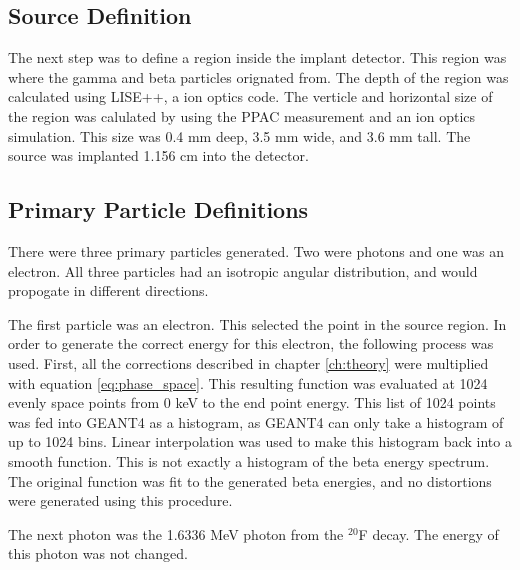 \subsection{Source Definition}
The next step was to define a region inside the implant detector.
This region was where the gamma and beta particles orignated from.
The depth of the region was calculated using LISE++, a ion optics code.
The verticle and horizontal size of the region was calulated by using the PPAC measurement and an ion optics simulation.
This size was 0.4 mm deep, 3.5 mm wide, and 3.6 mm tall.
The source was implanted 1.156 cm into the detector.

\subsection{Primary Particle Definitions}
There were three primary particles generated.
Two were photons and one was an electron.
All three particles had an isotropic angular distribution, and would propogate in different directions.

The first particle was an electron. 
This selected the point in the source region.
In order to generate the correct energy for this electron, the following process was used.
First, all the corrections described in chapter \ref{ch:theory} were multiplied with equation \ref{eq:phase_space}.
This resulting function was evaluated at 1024 evenly space points from 0 keV to the end point energy.
This list of 1024 points was fed into GEANT4 as a histogram, as GEANT4 can only take a histogram of up to 1024 bins. 
Linear interpolation was used to make this histogram back into a smooth function.
This is not exactly a histogram of the beta energy spectrum.
The original function was fit to the generated beta energies, and no distortions were generated using this procedure.

The next photon was the 1.6336 MeV photon from the $^{20}$F decay.
The energy of this photon was not changed.

